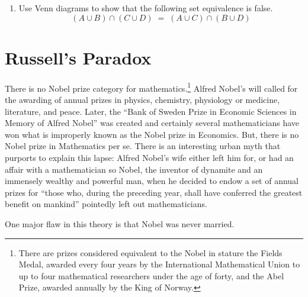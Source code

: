 \documentclass[10pt,]{book}
\theoremstyle{plain}
\theoremstyle{definition}
\theoremstyle{definition}
\numberwithin{equation}{section}
\newcommand{\hint}[1]{ }
\begin{document}
\begin{enumerate}[label=(\alph*)]
          \hint{Obviously we'll need one of the \(4\)-set Venn diagrams.}
\item\hypertarget{li-348}{}
          Use Venn diagrams to show that the following set equivalence is false.
          \begin{equation*}
            (A \cup B) \cap (C \cup D) \; = \; (A \cup C) \cap (B \cup D)
          \end{equation*}
          \hint{After constructing Venn diagrams for both sets you should be able to see that there
          are \(4\) regions where they differ.  One is \(A \cap B \cap \overline{C} \cap \overline{D}\).
          What are the other three?}
\end{enumerate}
\typeout{************************************************}
\typeout{************************************************}
\section[{Russell's Paradox}]{Russell's Paradox}\label{sec_russell}

    There is no Nobel prize category for mathematics.\footnote{There are prizes
    considered equivalent to the Nobel in stature \textemdash{} the Fields Medal, awarded every four years by the International Mathematical Union to up to four mathematical researchers under the age of forty, and the Abel Prize, awarded annually by the King of Norway.\label{fn-28}} Alfred Nobel's will
    called for the awarding of annual prizes in physics, chemistry, physiology
    or medicine, literature, and peace. Later, the
    ``Bank of Sweden Prize in Economic Sciences in Memory of Alfred Nobel''
    was created and certainly several mathematicians have won what is
    improperly known as the Nobel prize in Economics. But, there is no
    Nobel prize in Mathematics per se. There is an interesting urban myth that
    purports to explain this lapse: Alfred Nobel's wife either left him for, or
    had an affair with a mathematician \textemdash{} so Nobel, the inventor of dynamite
    and an immensely wealthy and powerful man, when he decided to endow
    a set of annual prizes for ``those who, during the preceding year, shall have conferred the greatest benefit on mankind'' pointedly left out mathematicians.
\par

    One major flaw in this theory is that Nobel was never married.
\par
\end{document}
